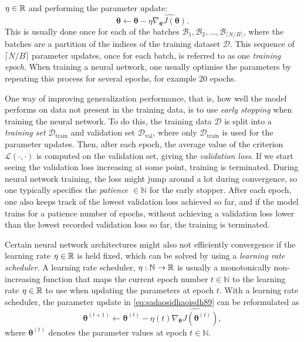 \documentclass{statsmsc}
\begin{document}
{$\eta \in \mathbb{R}$ and performing the parameter update:
\begin{equation}\label{eq:sadaosidhaoisdh89}
    \bm\theta \leftarrow \bm\theta - \eta \widehat{\nabla_{\bm\theta} J(\bm\theta)}.
\end{equation}
This is usually done once for each of the batches
$\mathcal{B}_1,\mathcal{B}_2,\dots, \mathcal{B}_{\lceil N / B \rceil}$, where
the batches are a partition of the indices of the training dataset
$\mathcal{D}$. This sequence of $\lceil N / B \rceil$ parameter updates, once for each batch, is
referred to as one \textit{training epoch}.
When training a neural network, one usually optimise the parameters by repeating this process
for several epochs, for example 20 epochs.


One way of improving generalization performance, that is, how well the model performs on data
not present in the training data, is to use \textit{early stopping} when training the neural
network. To do this, the training data $\mathcal{D}$ is split into a \textit{training set}
$\mathcal{D}_{\textrm{train}}$ and validation set $\mathcal{D}_{\textrm{val}}$, where only
$\mathcal{D}_{\textrm{train}}$ is used for the parameter updates.
Then, after each epoch, the average value of the criterion $\mathcal{L}(\cdot,\cdot)$ is computed on
the validation set, giving the \textit{validation loss}. If we start seeing the validation loss
increasing at some point, training is terminated. During neural network training, the loss
might jump around a lot during convergence, so one typically specifies the
\textit{patience} $\in\mathbb{N}$
for the early stopper. After each epoch, one also keeps track of the lowest validation loss achieved
so far, and if the model trains for a patience number of epochs, without achieving a validation
loss lower than the lowest recorded validation loss so far, the training is terminated.

Certain neural network architectures might also not efficiently convergence if the learning
rate $\eta \in \mathbb{R}$ is held fixed, which can be solved by using a \textit{learning rate scheduler}.
A learning rate scheduler, $\eta: \mathbb{N} \rightarrow {\mathbb{R}}$ is usually a
monotonically non-increasing function that maps the current epoch number $t \in \mathbb{N}$
to the learning rate $\eta \in \mathbb{R}$ to use when updating the parameters at epoch $t$. With
a learning rate scheduler, the parameter update in \cref{eq:sadaosidhaoisdh89} can be reformulated
as
\begin{equation}
    \bm\theta^{(t+1)} \leftarrow \bm\theta^{(t)} - \eta(t) \widehat{\nabla_{\bm\theta} J\left(\bm\theta^{(t)}\right)},
\end{equation}
where $\bm\theta^{(t)}$ denotes the parameter values at epoch $t \in \mathbb{N}$.

}
\end{document}
